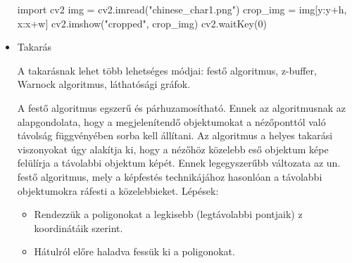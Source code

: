 \begin{itemize}
\begin{python}
import cv2
img = cv2.imread("chinese_char1.png")
crop_img = img[y:y+h, x:x+w]
cv2.imshow("cropped", crop_img)
cv2.waitKey(0)
\end{python}

\item Takarás

A takarásnak lehet több lehetséges módjai: festő algoritmus, z-buffer, Warnock algoritmus, láthatósági gráfok.

A festő algoritmus egszerű és párhuzamosítható. Ennek az algoritmusnak az alapgondolata, hogy a megjelenítendő objektumokat a nézőponttól való távolság függvényében sorba kell állítani. Az algoritmus a helyes takarási viszonyokat úgy alakítja ki, hogy a nézőhöz közelebb eső objektum képe felülírja a távolabbi objektum képét. Ennek legegyszerűbb változata az un. festő algoritmus, mely a képfestés technikájához hasonlóan a távolabbi objektumokra ráfesti a közelebbieket.
Lépések:
\begin{itemize}
\item Rendezzük a poligonokat a legkisebb (legtávolabbi pontjaik) z koordinátáik szerint.
\item Hátulról előre haladva fessük ki a poligonokat. 
\end{itemize}

\end{itemize}

